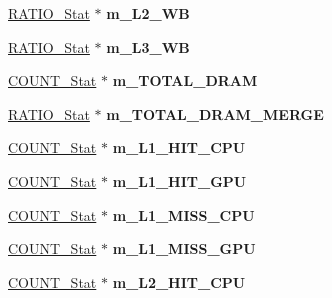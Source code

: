 \begin{DoxyCompactItemize}
\item 
\hypertarget{classall__stats__c_a754f1ab0b5677f2a7922ada6b8faf205}{
\hyperlink{classRATIO__Stat}{RATIO\_\-Stat} $\ast$ {\bfseries m\_\-L2\_\-WB}}
\label{classall__stats__c_a754f1ab0b5677f2a7922ada6b8faf205}

\item 
\hypertarget{classall__stats__c_a540a189b6339758a1142d48b4d9dd1b3}{
\hyperlink{classRATIO__Stat}{RATIO\_\-Stat} $\ast$ {\bfseries m\_\-L3\_\-WB}}
\label{classall__stats__c_a540a189b6339758a1142d48b4d9dd1b3}

\item 
\hypertarget{classall__stats__c_a410a8f813cfbbea3292cb8dfeabcadf1}{
\hyperlink{classCOUNT__Stat}{COUNT\_\-Stat} $\ast$ {\bfseries m\_\-TOTAL\_\-DRAM}}
\label{classall__stats__c_a410a8f813cfbbea3292cb8dfeabcadf1}

\item 
\hypertarget{classall__stats__c_a22e3a38d1f72e857073f2f53846d2d1e}{
\hyperlink{classRATIO__Stat}{RATIO\_\-Stat} $\ast$ {\bfseries m\_\-TOTAL\_\-DRAM\_\-MERGE}}
\label{classall__stats__c_a22e3a38d1f72e857073f2f53846d2d1e}

\item 
\hypertarget{classall__stats__c_a0f91c14834422f84b78f96a547becbb8}{
\hyperlink{classCOUNT__Stat}{COUNT\_\-Stat} $\ast$ {\bfseries m\_\-L1\_\-HIT\_\-CPU}}
\label{classall__stats__c_a0f91c14834422f84b78f96a547becbb8}

\item 
\hypertarget{classall__stats__c_a146a641d4b45b9328f69f228e3af2b4b}{
\hyperlink{classCOUNT__Stat}{COUNT\_\-Stat} $\ast$ {\bfseries m\_\-L1\_\-HIT\_\-GPU}}
\label{classall__stats__c_a146a641d4b45b9328f69f228e3af2b4b}

\item 
\hypertarget{classall__stats__c_af5b0c5fd0dfb12141304a67a98528679}{
\hyperlink{classCOUNT__Stat}{COUNT\_\-Stat} $\ast$ {\bfseries m\_\-L1\_\-MISS\_\-CPU}}
\label{classall__stats__c_af5b0c5fd0dfb12141304a67a98528679}

\item 
\hypertarget{classall__stats__c_ac67c1eef815de889858762af61d5c600}{
\hyperlink{classCOUNT__Stat}{COUNT\_\-Stat} $\ast$ {\bfseries m\_\-L1\_\-MISS\_\-GPU}}
\label{classall__stats__c_ac67c1eef815de889858762af61d5c600}

\item 
\hypertarget{classall__stats__c_ab624fae35556f3390e6e64bf8ed11674}{
\hyperlink{classCOUNT__Stat}{COUNT\_\-Stat} $\ast$ {\bfseries m\_\-L2\_\-HIT\_\-CPU}}
\label{classall__stats__c_ab624fae35556f3390e6e64bf8ed11674}


\end{DoxyCompactItemize}
